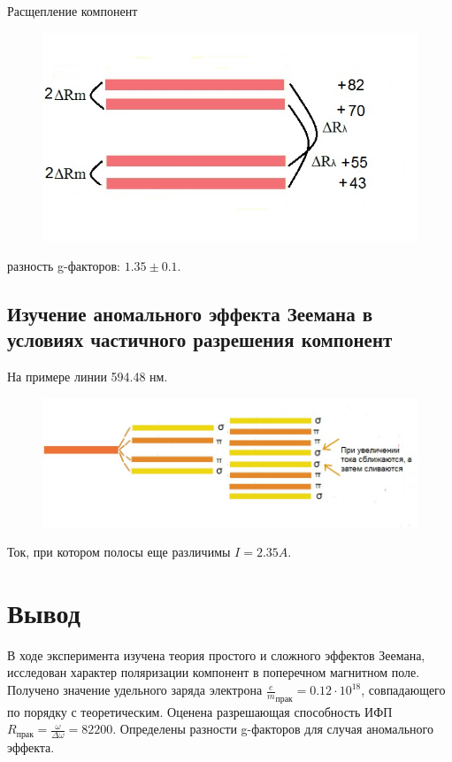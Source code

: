 Расщепление компонент
\begin{figure}[H]
	\centering
	\includegraphics[width=0.5\linewidth]{fig/fig20}
	\caption{}
	\label{fig:fig21}
\end{figure}

разность g-факторов: $1.35 \pm 0.1$.

\subsection{Изучение аномального эффекта Зеемана в условиях частичного разрешения компонент}
На примере линии 594.48 нм.
\begin{figure}[H]
	\centering
	\includegraphics[width=0.8\linewidth]{fig/fig21}
	\caption{}
	\label{fig:fig22}
\end{figure}

Ток, при котором полосы еще различимы $I=2.35 A$. 

\section{Вывод}
В ходе эксперимента изучена теория простого и сложного эффектов Зеемана, исследован характер поляризации компонент в поперечном магнитном поле. Получено значение удельного заряда электрона $\frac{e}{m}_{\text{прак}} = 0.12\cdot10^{18}$, совпадающего по порядку с теоретическим. Оценена разрешающая способность ИФП $R_{\text{прак}}=\frac{\omega}{\Delta \omega}= 82 200$. Определены разности g-факторов для случая аномального эффекта. 
